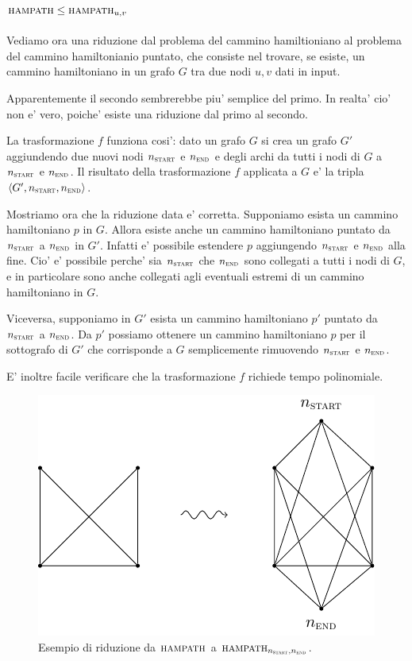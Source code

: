 \subsection{$\textsc{hampath} \leq \textsc{hampath}_{u,v}$}

Vediamo ora una riduzione dal problema del cammino hamiltioniano al problema del cammino
hamiltonianio puntato, che consiste nel trovare, se esiste, un cammino hamiltoniano in un grafo $G$
tra due nodi $u, v$ dati in input.

Apparentemente il secondo sembrerebbe piu' semplice del primo. In realta' cio' non e' vero, poiche'
esiste una riduzione dal primo al secondo.

La trasformazione $f$ funziona cosi': dato un grafo $G$ si crea un grafo $G'$ aggiundendo due nuovi
nodi $n_{\textsc{start}}$ e $n_{\textsc{end}}$ e degli archi da tutti i nodi di $G$ a
$n_{\textsc{start}}$ e $n_{\textsc{end}}$. Il risultato della trasformazione $f$ applicata a $G$ e'
la tripla $\langle G',n_{\textsc{start}},n_{\textsc{end}} \rangle$.

Mostriamo ora che la riduzione data e' corretta. Supponiamo esista un cammino hamiltoniano $p$ in
$G$. Allora esiste anche un cammino hamiltoniano puntato da $n_{\textsc{start}}$ a
$n_{\textsc{end}}$ in $G'$. Infatti e' possibile estendere $p$ aggiungendo $n_{\textsc{start}}$ e
$n_{\textsc{end}}$ alla fine. Cio' e' possibile perche' sia $n_{\textsc{start}}$ che
$n_{\textsc{end}}$ sono collegati a tutti i nodi di $G$, e in particolare sono anche collegati agli
eventuali estremi di un cammino hamiltoniano in $G$.

Viceversa, supponiamo in $G'$ esista un cammino hamiltoniano $p'$ puntato da $n_{\textsc{start}}$ a
$n_{\textsc{end}}$. Da $p'$ possiamo ottenere un cammino hamiltoniano $p$ per il sottografo di $G'$
che corrisponde a $G$ semplicemente rimuovendo $n_{\textsc{start}}$ e $n_{\textsc{end}}$.

E' inoltre facile verificare che la trasformazione $f$ richiede tempo polinomiale.

\begin{figure}[h]
    \begin{center}
        \includegraphics{./img/NPClass/HAM2PHAM.pdf}
        \caption{Esempio di riduzione da $\textsc{hampath}$ a
        $\textsc{hampath}_{n_{\textsc{start}},n_{\textsc{end}}}$.}
    \end{center}
\end{figure}

